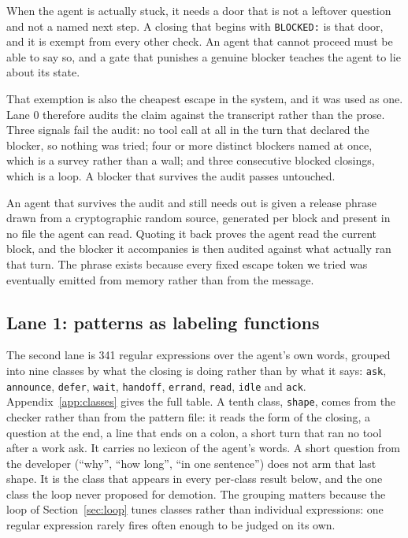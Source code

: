 When the agent is actually stuck, it needs a door that is not a leftover
question and not a named next step. A closing that begins with
\texttt{BLOCKED:} is that door, and it is exempt from every other check.
An agent that cannot proceed must be able to say so, and a gate that
punishes a genuine blocker teaches the agent to lie about its state.

That exemption is also the cheapest escape in the system, and it was used as
one. Lane 0 therefore audits the claim against the transcript rather than the
prose. Three signals fail the audit: no tool call at all in the turn that
declared the blocker, so nothing was tried; four or more distinct blockers named
at once, which is a survey rather than a wall; and three consecutive blocked
closings, which is a loop. A blocker that survives the audit passes untouched.

An agent that survives the audit and still needs out is given a release phrase
drawn from a cryptographic random source, generated per block and present in no
file the agent can read. Quoting it back proves the agent read the current
block, and the blocker it accompanies is then audited against what actually ran
that turn. The phrase exists because every fixed escape token we tried was
eventually emitted from memory rather than from the message.

\subsection{Lane 1: patterns as labeling functions}

The second lane is 341 regular expressions over the agent's own words, grouped
into nine classes by what the closing is doing rather than by what it says:
\texttt{ask}, \texttt{announce}, \texttt{defer}, \texttt{wait},
\texttt{handoff}, \texttt{errand}, \texttt{read}, \texttt{idle} and
\texttt{ack}. Appendix~\ref{app:classes} gives the full table. A tenth class,
\texttt{shape}, comes from the checker rather than from the pattern file: it
reads the form of the closing, a question at the end, a line that ends on a
colon, a short turn that ran no tool after a work ask. It carries no lexicon
of the agent's words. A short question from the developer (``why'',
``how long'', ``in one sentence'') does not arm that last shape. It is
the class that appears in every per-class result below, and the one class the
loop never proposed for demotion. The grouping
matters because the loop of Section~\ref{sec:loop} tunes classes rather than
individual expressions: one regular expression rarely fires often enough to be
judged on its own.

